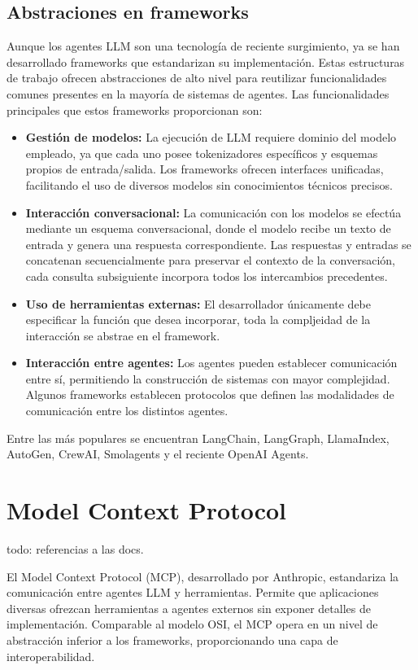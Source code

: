 \subsection{Abstraciones en frameworks}
Aunque los agentes LLM son una tecnología de reciente surgimiento, ya se han desarrollado frameworks que estandarizan su implementación. Estas estructuras de trabajo ofrecen abstracciones de alto nivel para reutilizar funcionalidades comunes presentes en la mayoría de sistemas de agentes.
Las funcionalidades principales que estos frameworks proporcionan son:
\begin{itemize}
\item {\textbf{Gestión de modelos:}} La ejecución de LLM requiere dominio del modelo empleado, ya que cada uno posee tokenizadores específicos y esquemas propios de entrada/salida. Los frameworks ofrecen interfaces unificadas, facilitando el uso de diversos modelos sin conocimientos técnicos precisos.
\item {\textbf{Interacción conversacional:}} La comunicación con los modelos se efectúa mediante un esquema conversacional, donde el modelo recibe un texto de entrada y genera una respuesta correspondiente. Las respuestas y entradas se concatenan secuencialmente para preservar el contexto de la conversación, cada consulta subsiguiente incorpora todos los intercambios precedentes.
  \item {\textbf{Uso de herramientas externas:}} El desarrollador únicamente debe especificar la función que desea incorporar, toda la compljeidad de la interacción se abstrae en el framework.
\item {\textbf{Interacción entre agentes:}} Los agentes pueden establecer comunicación entre sí, permitiendo la construcción de sistemas con mayor complejidad. Algunos frameworks establecen protocolos que definen las modalidades de comunicación entre los distintos agentes.
\end{itemize}

Entre las más populares se encuentran LangChain, LangGraph, LlamaIndex, AutoGen, CrewAI, Smolagents y el reciente OpenAI Agents. 

\section{Model Context Protocol}
todo: referencias a las docs.

El Model Context Protocol (MCP), desarrollado por Anthropic, estandariza la comunicación entre agentes LLM y herramientas. Permite que aplicaciones diversas ofrezcan herramientas a agentes externos sin exponer detalles de implementación. Comparable al modelo OSI, el MCP opera en un nivel de abstracción inferior a los frameworks, proporcionando una capa de interoperabilidad.

